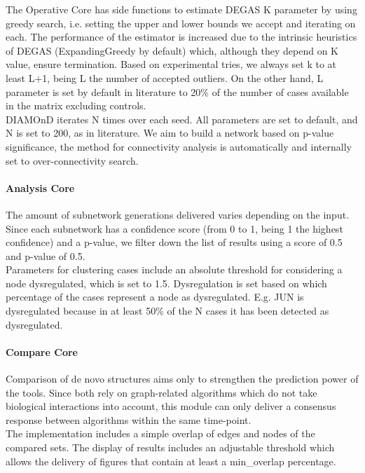The Operative Core has side functions to estimate DEGAS K parameter by using greedy search, i.e. setting the upper and lower bounds we accept and iterating on each. The performance of the estimator is increased due to the intrinsic heuristics of DEGAS (ExpandingGreedy by default) which, although they depend on K value, ensure termination. Based on experimental tries, we always set k to at least L+1, being L the number of accepted outliers. 
On the other hand, L parameter is set by default in literature to 20\% of the number of cases available in the matrix excluding controls.
\\

DIAMOnD iterates N times over each seed. All parameters are set to default, and N is set to 200, as in literature. We aim to build a network based on p-value significance, the method for connectivity analysis is automatically and internally set to over-connectivity search.

\paragraph{Analysis Core}
The amount of subnetwork generations delivered varies depending on the input. Since each subnetwork has a confidence score (from 0 to 1, being 1 the highest confidence) and a p-value, we filter down the list of results using a score of 0.5 and p-value of 0.5.
\\

Parameters for clustering cases include an absolute threshold for considering a node dysregulated, which is set to 1.5. Dysregulation is set based on which percentage of the cases represent a node as dysregulated. E.g. JUN is dysregulated because in at least 50\% of the N cases it has been detected as dysregulated.

\paragraph{Compare Core}
Comparison of de novo structures aims only to strengthen the prediction power of the tools. Since both rely on graph-related algorithms which do not take biological interactions into account, this module can only deliver a consensus response between algorithms within the same time-point.
\\

The implementation includes a simple overlap of edges and nodes of the compared sets. The display of results includes an adjustable threshold which allows the delivery of figures that contain at least a min\_overlap percentage.


